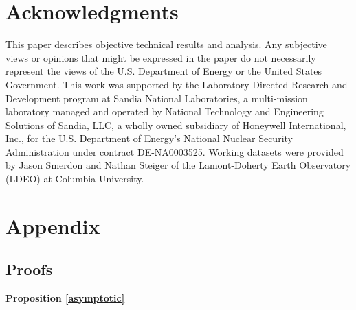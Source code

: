 \documentclass[12pt]{article}
\newtheorem{proposition}{Proposition}[section]
\begin{document}
\section*{Acknowledgments}
This paper describes objective technical results and analysis. Any subjective views or opinions that might be expressed in the paper do not necessarily represent the views of the U.S. Department of Energy or the United States Government.
This work was supported by the Laboratory Directed Research and Development program at
Sandia National Laboratories, a multi-mission laboratory managed and
operated by National Technology and Engineering Solutions of Sandia,
LLC, a wholly owned subsidiary of Honeywell International, Inc., for the
U.S. Department of Energy's National Nuclear Security Administration
under contract DE-NA0003525.
Working datasets were provided by Jason Smerdon and Nathan Steiger of the Lamont-Doherty Earth Observatory (LDEO) at Columbia University.

\appendix
\section{Appendix}

\subsection{Proofs}

\textbf{Proposition \ref{asymptotic}}

\end{document}
